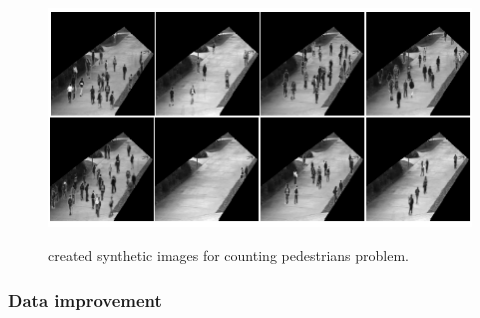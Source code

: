 \begin{enumerate}
\begin{figure}[H]
	\centering
	{\includegraphics[width=1\textwidth]{images/myped}}
	\caption{created synthetic images for counting pedestrians problem.}
	\label{fig:myped}
\end{figure}

\end{enumerate}

\subsubsection{Data improvement}

